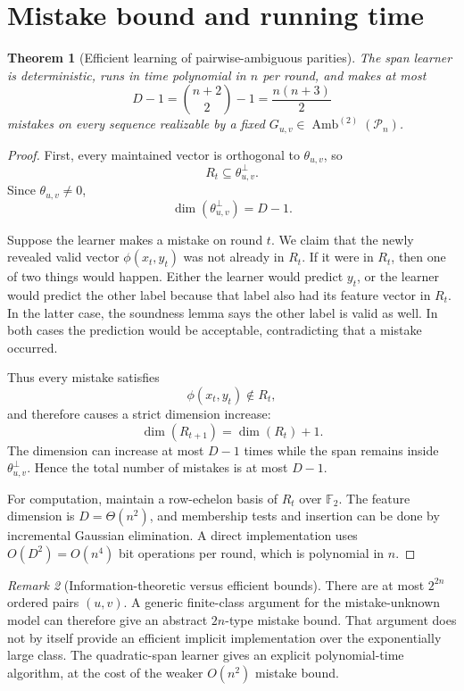 \documentclass[11pt]{article}
\newtheorem{theorem}{Theorem}
\theoremstyle{definition}
\theoremstyle{remark}
\newtheorem{remark}[theorem]{Remark}
\newcommand{\F}{\mathbb{F}_2}
\newcommand{\Pn}{\mathcal{P}_n}
\newcommand{\Amb}{\operatorname{Amb}}
\begin{document}
\section{Mistake bound and running time}

\begin{theorem}[Efficient learning of pairwise-ambiguous parities]
The span learner is deterministic, runs in time polynomial in $n$ per round,
and makes at most
\[
  D-1
  =
  \binom{n+2}{2}-1
  =
  \frac{n(n+3)}{2}
\]
mistakes on every sequence realizable by a fixed
$G_{u,v}\in\Amb^{(2)}(\Pn)$.
\end{theorem}

\begin{proof}
First, every maintained vector is orthogonal to $\theta_{u,v}$, so
\[
  R_t\subseteq\theta_{u,v}^{\perp}.
\]
Since $\theta_{u,v}\neq 0$,
\[
  \dim(\theta_{u,v}^{\perp})=D-1.
\]

Suppose the learner makes a mistake on round $t$.  We claim that the newly
revealed valid vector $\phi(x_t,y_t)$ was not already in $R_t$.  If it were in
$R_t$, then one of two things would happen.  Either the learner would predict
$y_t$, or the learner would predict the other label because that label also
had its feature vector in $R_t$.  In the latter case, the soundness lemma says
the other label is valid as well.  In both cases the prediction would be
acceptable, contradicting that a mistake occurred.

Thus every mistake satisfies
\[
  \phi(x_t,y_t)\notin R_t,
\]
and therefore causes a strict dimension increase:
\[
  \dim(R_{t+1})=\dim(R_t)+1.
\]
The dimension can increase at most $D-1$ times while the span remains inside
$\theta_{u,v}^{\perp}$.  Hence the total number of mistakes is at most $D-1$.

For computation, maintain a row-echelon basis of $R_t$ over $\F$.  The feature
dimension is $D=\Theta(n^2)$, and membership tests and insertion can be done
by incremental Gaussian elimination.  A direct implementation uses
$O(D^2)=O(n^4)$ bit operations per round, which is polynomial in $n$.
\end{proof}

\begin{remark}[Information-theoretic versus efficient bounds]
There are at most $2^{2n}$ ordered pairs $(u,v)$.  A generic finite-class
argument for the mistake-unknown model can therefore give an abstract
$2n$-type mistake bound.  That argument does not by itself provide an
efficient implicit implementation over the exponentially large class.  The
quadratic-span learner gives an explicit polynomial-time algorithm, at the
cost of the weaker $O(n^2)$ mistake bound.
\end{remark}
\end{document}
